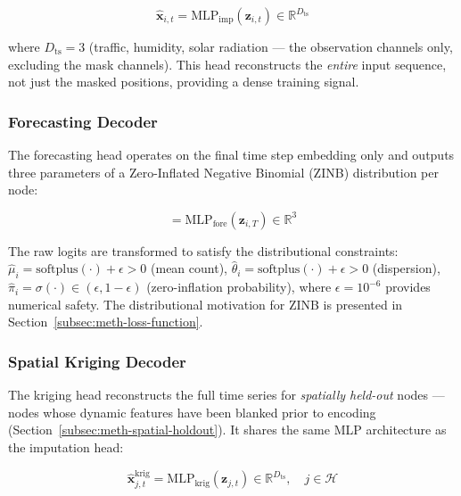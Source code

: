 \begin{equation}
    \hat{\mathbf{x}}_{i,t} = \text{MLP}_{\text{imp}}(\mathbf{z}_{i,t}) \in \mathbb{R}^{D_{\text{ts}}}
    \label{eq:imputation-decoder}
\end{equation}

\noindent where $D_{\text{ts}} = 3$ (traffic, humidity, solar radiation --- the observation channels only, excluding the mask channels). This head reconstructs the \emph{entire} input sequence, not just the masked positions, providing a dense training signal.

\subsubsection{Forecasting Decoder}

The forecasting head operates on the final time step embedding only and outputs three parameters of a Zero-Inflated Negative Binomial (ZINB) distribution per node:

\begin{equation}
    [\hat{\mu}_i,\; \hat{\theta}_i,\; \hat{\pi}_i] = \text{MLP}_{\text{fore}}(\mathbf{z}_{i,T}) \in \mathbb{R}^{3}
    \label{eq:forecast-decoder}
\end{equation}

\noindent The raw logits are transformed to satisfy the distributional constraints: $\hat{\mu}_i = \text{softplus}(\cdot) + \epsilon > 0$ (mean count), $\hat{\theta}_i = \text{softplus}(\cdot) + \epsilon > 0$ (dispersion), $\hat{\pi}_i = \sigma(\cdot) \in (\epsilon, 1 - \epsilon)$ (zero-inflation probability), where $\epsilon = 10^{-6}$ provides numerical safety. The distributional motivation for ZINB is presented in Section~\ref{subsec:meth-loss-function}.

\subsubsection{Spatial Kriging Decoder}

The kriging head reconstructs the full time series for \emph{spatially held-out} nodes --- nodes whose dynamic features have been blanked prior to encoding (Section~\ref{subsec:meth-spatial-holdout}). It shares the same MLP architecture as the imputation head:

\begin{equation}
    \hat{\mathbf{x}}^{\text{krig}}_{j,t} = \text{MLP}_{\text{krig}}(\mathbf{z}_{j,t}) \in \mathbb{R}^{D_{\text{ts}}}, \quad j \in \mathcal{H}
    \label{eq:kriging-decoder}
\end{equation}

